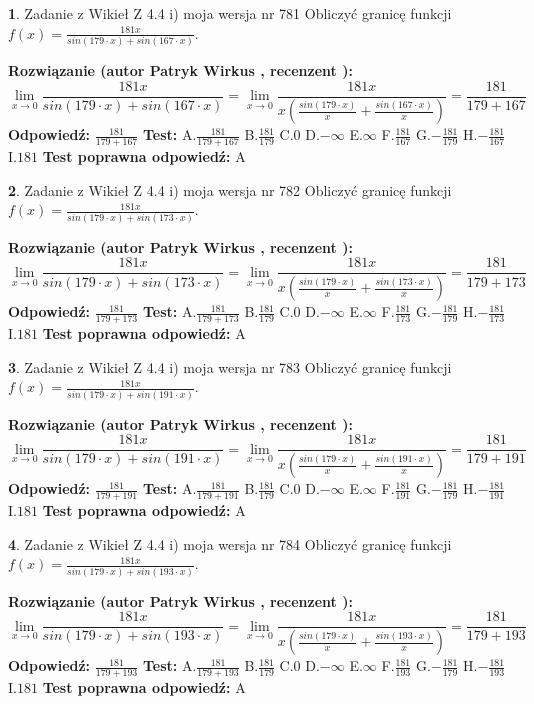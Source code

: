 \documentclass[12pt, a4paper]{article}
\theoremstyle{definition} %
\newtheorem{zad}{}
\newcommand{\zadStart}[1]{\begin{zad}#1\newline}
\newcommand{\zadStop}{\end{zad}}
\newcommand{\rozwStart}[2]{\noindent \textbf{Rozwiązanie (autor #1 , recenzent #2): }\newline}
\newcommand{\rozwStop}{\newline}
\newcommand{\odpStart}{\noindent \textbf{Odpowiedź:}\newline}
\newcommand{\odpStop}{\newline}
\newcommand{\testStart}{\noindent \textbf{Test:}\newline}
\newcommand{\testStop}{\newline}
\newcommand{\kluczStart}{\noindent \textbf{Test poprawna odpowiedź:}\newline}
\newcommand{\kluczStop}{\newline}
\begin{document}
\zadStart{Zadanie z Wikieł Z 4.4 i) moja wersja nr 781}
Obliczyć granicę funkcji $f(x)=\frac{181x}{sin(179\cdot x) +sin(167\cdot x)}$.
\zadStop
\rozwStart{Patryk Wirkus}{}
$$\lim\limits_{x\to 0}\frac{181x}{sin(179\cdot x) +sin(167\cdot x)}=\lim\limits_{x\to 0}\frac{181x}{x(\frac{sin(179\cdot x)}{x}+\frac{sin(167\cdot x)}{x})}=\frac{181}{179+167}$$
\rozwStop
\odpStart
$\frac{181}{179+167}$
\odpStop
\testStart
A.$\frac{181}{179+167}$
B.$\frac{181}{179}$
C.$0$
D.$-\infty$
E.$\infty$
F.$\frac{181}{167}$
G.$-\frac{181}{179}$
H.$-\frac{181}{167}$
I.$181$
\testStop
\kluczStart
A
\kluczStop



\zadStart{Zadanie z Wikieł Z 4.4 i) moja wersja nr 782}
Obliczyć granicę funkcji $f(x)=\frac{181x}{sin(179\cdot x) +sin(173\cdot x)}$.
\zadStop
\rozwStart{Patryk Wirkus}{}
$$\lim\limits_{x\to 0}\frac{181x}{sin(179\cdot x) +sin(173\cdot x)}=\lim\limits_{x\to 0}\frac{181x}{x(\frac{sin(179\cdot x)}{x}+\frac{sin(173\cdot x)}{x})}=\frac{181}{179+173}$$
\rozwStop
\odpStart
$\frac{181}{179+173}$
\odpStop
\testStart
A.$\frac{181}{179+173}$
B.$\frac{181}{179}$
C.$0$
D.$-\infty$
E.$\infty$
F.$\frac{181}{173}$
G.$-\frac{181}{179}$
H.$-\frac{181}{173}$
I.$181$
\testStop
\kluczStart
A
\kluczStop



\zadStart{Zadanie z Wikieł Z 4.4 i) moja wersja nr 783}
Obliczyć granicę funkcji $f(x)=\frac{181x}{sin(179\cdot x) +sin(191\cdot x)}$.
\zadStop
\rozwStart{Patryk Wirkus}{}
$$\lim\limits_{x\to 0}\frac{181x}{sin(179\cdot x) +sin(191\cdot x)}=\lim\limits_{x\to 0}\frac{181x}{x(\frac{sin(179\cdot x)}{x}+\frac{sin(191\cdot x)}{x})}=\frac{181}{179+191}$$
\rozwStop
\odpStart
$\frac{181}{179+191}$
\odpStop
\testStart
A.$\frac{181}{179+191}$
B.$\frac{181}{179}$
C.$0$
D.$-\infty$
E.$\infty$
F.$\frac{181}{191}$
G.$-\frac{181}{179}$
H.$-\frac{181}{191}$
I.$181$
\testStop
\kluczStart
A
\kluczStop



\zadStart{Zadanie z Wikieł Z 4.4 i) moja wersja nr 784}
Obliczyć granicę funkcji $f(x)=\frac{181x}{sin(179\cdot x) +sin(193\cdot x)}$.
\zadStop
\rozwStart{Patryk Wirkus}{}
$$\lim\limits_{x\to 0}\frac{181x}{sin(179\cdot x) +sin(193\cdot x)}=\lim\limits_{x\to 0}\frac{181x}{x(\frac{sin(179\cdot x)}{x}+\frac{sin(193\cdot x)}{x})}=\frac{181}{179+193}$$
\rozwStop
\odpStart
$\frac{181}{179+193}$
\odpStop
\testStart
A.$\frac{181}{179+193}$
B.$\frac{181}{179}$
C.$0$
D.$-\infty$
E.$\infty$
F.$\frac{181}{193}$
G.$-\frac{181}{179}$
H.$-\frac{181}{193}$
I.$181$
\testStop
\kluczStart
A
\kluczStop
\end{document}

